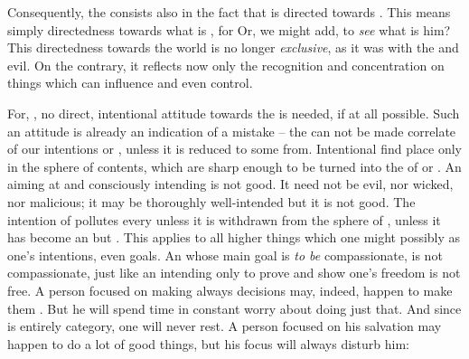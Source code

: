 \newp
\pa Consequently, the  consists also in the fact that  is
directed towards . This means simply directedness towards what is
, for  Or, we might add, to {\em see} what is
 him? This directedness towards the world is no longer {\em
  exclusive}, as it was with the  and  evil. On the
contrary, it reflects now only the recognition  and
concentration on  things which  can influence and even
control. 

For, , no direct, intentional attitude towards the  is
needed, if at all possible.  Such an attitude is already an indication of a
mistake -- the  can not be made correlate of our intentions or
, unless it is reduced to some  from.
Intentional  find place only in the sphere of  contents,
 which are sharp enough to be turned into the  of
 or .  An  aiming at and consciously intending
 is not good.  It need not be evil, nor wicked, nor malicious; it
may be thoroughly well-intended but it is not good. The intention of  pollutes every  unless it is withdrawn from the sphere of
, unless it has become an  but .
This applies to all higher things which one might possibly  as one's
intentions, even goals.  An  whose main goal is {\em to be}
compassionate, is not compassionate, just like an  intending only to
prove and show one's freedom is not free.  A person focused on making always
 decisions may, indeed, happen to make them . But he will
spend time in constant worry about doing just that. And since  is
entirely  category, one will never rest. A person focused on his
salvation may happen to do a lot of good things, but his focus will always
disturb him: 

